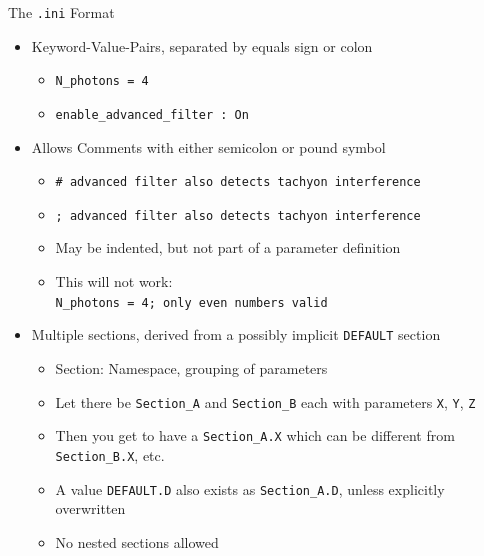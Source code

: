\begin{frame}{The \texttt{.ini} Format}
%
\begin{itemize}
\item Keyword-Value-Pairs, separated by equals sign or colon
	\begin{itemize}
	\item \texttt{N\_photons = 4}
	\item \texttt{enable\_advanced\_filter : On}
	\end{itemize}
\item Allows Comments with either semicolon or pound symbol
	\begin{itemize}
	\item \texttt{\# advanced filter also detects tachyon interference}
	\item \texttt{; advanced filter also detects tachyon interference}
	\item May be indented, but not part of a parameter definition
	\item[\Thus] This will not work: \\
		\texttt{N\_photons = 4; only even numbers valid} 
	\end{itemize}
\item Multiple sections, derived from a possibly implicit \texttt{DEFAULT} section
	\begin{itemize}
	\item Section: Namespace, grouping of parameters
	\item Let there be \texttt{Section\_A} and \texttt{Section\_B} each with parameters \texttt{X}, \texttt{Y}, \texttt{Z}
	\item Then you get to have a \texttt{Section\_A.X} which can be different from \texttt{Section\_B.X}, etc.
	\item A value \texttt{DEFAULT.D} also exists as \texttt{Section\_A.D}, unless explicitly overwritten
	\item No nested sections allowed
	\end{itemize}
\end{itemize}
%
\end{frame}


